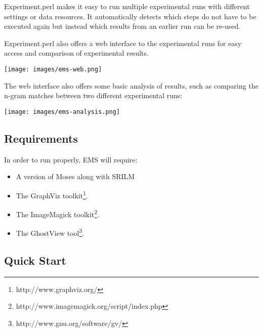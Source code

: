 Experiment.perl makes it easy to run multiple experimental runs with different settings or data resources. It automatically detects which steps do not have to be executed again but instead which results from an earlier run can be re-used.



Experiment.perl also offers a web interface to the experimental runs for easy access and comparison of experimental results.









\begin{center}
\texttt{[image: images/ems-web.png]}
\end{center}




The web interface also offers some basic analysis of results, such as comparing the n-gram matches between two different experimental runs:









\begin{center}
\texttt{[image: images/ems-analysis.png]}
\end{center}




\subsection{
\label{experiment-perl.texntoc2}Requirements}


In order to run properly, EMS will require:

\begin{itemize}
\item A version of Moses along with SRILM

\item The GraphViz toolkit\footnote{\sf http://www.graphviz.org/}.

\item The ImageMagick toolkit\footnote{\sf http://www.imagemagick.org/script/index.php}.

\item The GhostView tool\footnote{\sf http://www.gnu.org/software/gv/}.

\end{itemize}

\subsection{
\label{experiment-perl.texntoc3}Quick Start}


